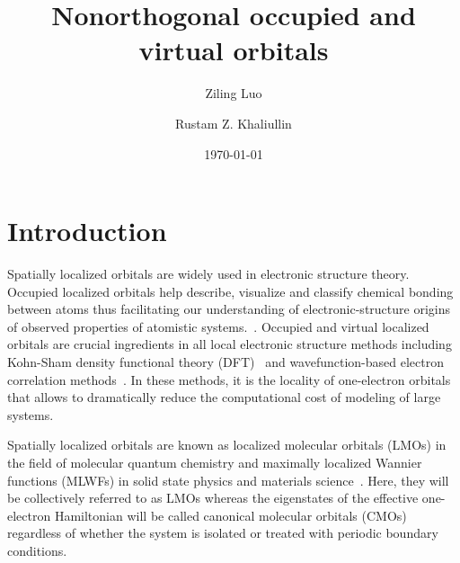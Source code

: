 \documentclass[aps,prl,reprint,amsmath,amssymb]{revtex4-1}
\begin{document}
\nocite{achemso-ctrl}



\title{
Nonorthogonal  occupied and virtual orbitals
}

\author{Ziling Luo}
\author{Rustam Z. Khaliullin}

\date{\today}

\begin{abstract}

\end{abstract}


\maketitle

\section{Introduction} 
Spatially localized orbitals are widely used in electronic structure theory.
Occupied localized orbitals help describe, visualize and classify chemical bonding between atoms thus facilitating our understanding of electronic-structure origins of observed properties of atomistic systems.~\cite{boys1960construction, edmiston1963localized, pipek1989fast, niessen1972density, weinhold2012natural}.
Occupied and virtual localized orbitals are crucial ingredients in all local electronic structure methods including Kohn-Sham density functional theory (DFT)~\cite{goedecker1994efficient, bowler2012methods, zalesny2011linear, pulay1986orbital, saebo2001low, pisani2005local, hampel1996local, forner1997numerical} and wavefunction-based electron correlation methods~\cite{saebo1993local, schutz1999low, hetzer2000low, schutz2001low}.
In these methods, it is the locality of one-electron orbitals that allows to dramatically reduce the computational cost of modeling of large systems.

Spatially localized orbitals are known as localized molecular orbitals (LMOs) in the field of molecular quantum chemistry and maximally localized Wannier functions (MLWFs) in solid state physics and materials science~\cite{marzari2012maximally}.
Here, they will be collectively referred to as LMOs whereas the eigenstates of the effective one-electron Hamiltonian will be called canonical molecular orbitals (CMOs) regardless of whether the system is isolated or treated with periodic boundary conditions.
\end{document}
